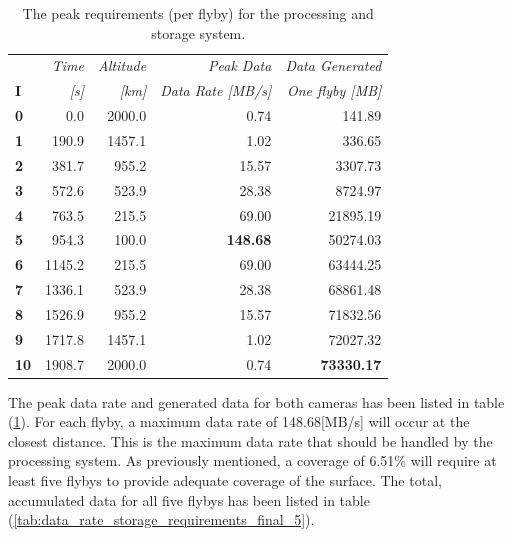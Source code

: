 \begin{table}[htb!]
  \centering
    \begin{tabular}{l|r|r|r|r|}
\textbf{} & \textit{Time} & \textit{Altitude} & \textit{Peak Data} & \multicolumn{1}{r}{\textit{Data Generated}} \\
\textbf{I} & \textit{[s]} & \textit{[km]} & \textit{Data Rate [MB/s]} & \multicolumn{1}{r}{\textit{One flyby [MB]}} \bigstrut[b]\\
\hline
\textbf{0} & 0.0   & 2000.0 & 0.74  & 141.89 \bigstrut[t]\\
\textbf{1} & 190.9 & 1457.1 & 1.02  & 336.65 \\
\textbf{2} & 381.7 & 955.2 & 15.57 & 3307.73 \\
\textbf{3} & 572.6 & 523.9 & 28.38 & 8724.97 \\
\textbf{4} & 763.5 & 215.5 & 69.00 & 21895.19 \\
\textbf{5} & 954.3 & 100.0 & \textbf{148.68} & 50274.03 \\
\textbf{6} & 1145.2 & 215.5 & 69.00 & 63444.25 \\
\textbf{7} & 1336.1 & 523.9 & 28.38 & 68861.48 \\
\textbf{8} & 1526.9 & 955.2 & 15.57 & 71832.56 \\
\textbf{9} & 1717.8 & 1457.1 & 1.02  & 72027.32 \\
\textbf{10} & 1908.7 & 2000.0 & 0.74  & \textbf{73330.17} \\
\end{tabular}%
        \caption{The peak requirements (per flyby) for the processing and storage system.}
  \label{tab:data_rate_storage_requirements_final}%
\end{table}%
The peak data rate and generated data for both cameras has been listed in table (\ref{tab:data_rate_storage_requirements_final}). For each flyby, a maximum data rate of 148.68[MB/s] will occur at the closest distance. This is the maximum data rate that should be handled by the processing system. 
As previously mentioned, a coverage of 6.51\% will require at least five flybys to provide adequate coverage of the surface. The total, accumulated data for all five flybys has been listed in table (\ref{tab:data_rate_storage_requirements_final_5}).
